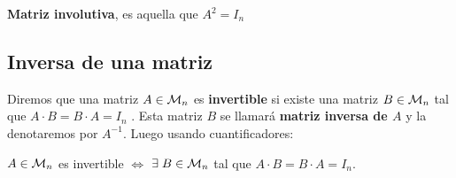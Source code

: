 \begin{defin}
\textbf{Matriz involutiva}, es aquella que $A^2=I_n$
\end{defin}



\subsection{Inversa de una matriz}

\begin{defin}
Diremos que una matriz $A\in\mathcal{M}_n$ es \textbf{invertible} si existe una matriz
$B \in \mathcal{M}_n$ tal que $A\cdot B = B\cdot A = I_n$ . Esta matriz $B$ se llamará \textbf{matriz inversa de $A$} y la denotaremos por $A^{-1}$. Luego usando cuantificadores:  
\begin{center}
  $A\in \mathcal{M}_n$ es invertible $\Longleftrightarrow$ $\exists \;B \in\mathcal{M}_n$ tal que $A\cdot B = B\cdot A = I_n$.  
\end{center}

\end{defin}

